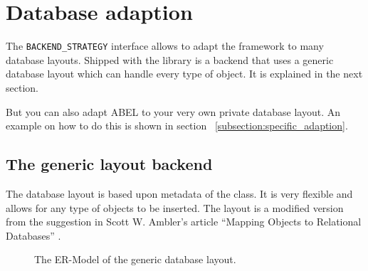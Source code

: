 \section{Database adaption}

The \lstinline!BACKEND_STRATEGY! interface allows to adapt the framework to many database layouts.
Shipped with the library is a backend that uses a generic database layout which can handle every type of object.
It is explained in the next section.

But you can also adapt ABEL to your very own private database layout.
An example on how to do this is shown in section ~\ref{subsection:specific_adaption}.

\subsection{The generic layout backend}

The database layout is based upon metadata of the class. 
It is very flexible and allows for any type of objects to be inserted.
The layout is a modified version from the suggestion in Scott W. Ambler's article ``Mapping Objects to Relational Databases'' \cite{AmblerORM}.

\begin{figure} [h!]
\centering
{}
\caption{The ER-Model of the generic database layout.}
\label{fig:er_model_generic_layout}
\end{figure}

